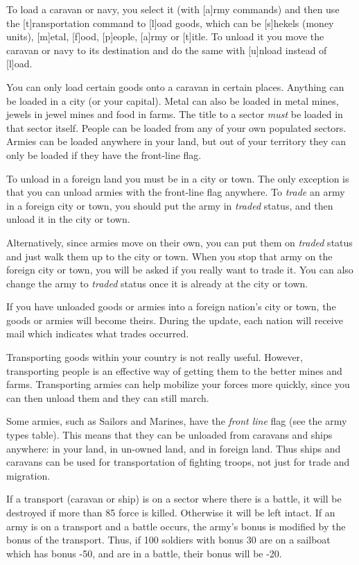 To load a caravan or navy, you select it (with [a]rmy commands) and
then use the [t]ransportation command to [l]oad goods, which can be
[s]hekels (money units), [m]etal, [f]ood, [p]eople, [a]rmy or
[t]itle.  To unload it you move the caravan or navy to its destination
and do the same with [u]nload instead of [l]oad.

You can only load certain goods onto a caravan in certain places.
Anything can be loaded in a city (or your capital).  Metal can also be
loaded in metal mines, jewels in jewel mines and food in farms.  The
title to a sector {\em must} be loaded in that sector itself.  People
can be loaded from any of your own populated sectors.  Armies can be
loaded anywhere in your land, but out of your territory they can only
be loaded if they have the front-line flag.

To unload in a foreign land you must be in a city or town.  The only
exception is that you can unload armies with the front-line flag
anywhere.  To {\em trade} an army in a foreign city or town, you
should put the army in {\em traded} status, and then unload it in the
city or town.

Alternatively, since armies move on their own, you can put them on
{\em traded} status and just walk them up to the city or town.  When
you stop that army on the foreign city or town, you will be asked if
you really want to trade it.  You can also change the army to {\em
traded} status once it is already at the city or town.

If you have unloaded goods or armies into a foreign nation's city or
town, the goods or armies will become theirs.  During the update, each
nation will receive mail which indicates what trades occurred.

Transporting goods within your country is not really useful.  However,
transporting people is an effective way of getting them to the better
mines and farms.  Transporting armies can help mobilize your forces
more quickly, since you can then unload them and they can still march.

Some armies, such as Sailors and Marines, have the {\em front line}
flag (see the army types table).  This means that they can be unloaded
from caravans and ships anywhere: in your land, in un-owned land, and
in foreign land.  Thus ships and caravans can be used for
transportation of fighting troops, not just for trade and migration.

If a transport (caravan or ship) is on a sector where there is a
battle, it will be destroyed if more than 85%
force is killed.  Otherwise it will be left intact.  If an army is on
a transport and a battle occurs, the army's bonus is modified by the
bonus of the transport.  Thus, if 100 soldiers with bonus 30 are on a
sailboat which has bonus -50, and are in a battle, their bonus will be
-20.

